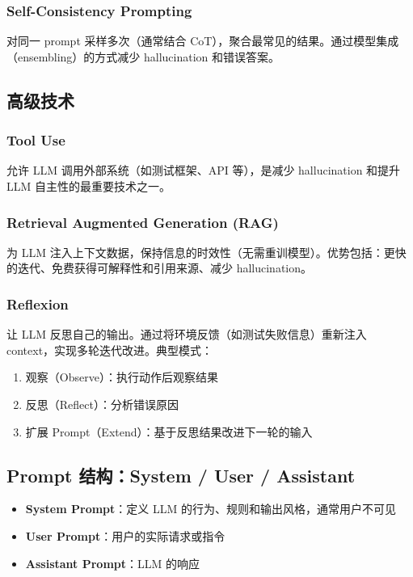 \subsubsection{Self-Consistency Prompting}

对同一 prompt 采样多次（通常结合 CoT），聚合最常见的结果。通过模型集成（ensembling）的方式减少 hallucination 和错误答案。

\subsection{高级技术}

\subsubsection{Tool Use}

允许 LLM 调用外部系统（如测试框架、API 等），是减少 hallucination 和提升 LLM 自主性的最重要技术之一。

\subsubsection{Retrieval Augmented Generation (RAG)}

为 LLM 注入上下文数据，保持信息的时效性（无需重训模型）。优势包括：更快的迭代、免费获得可解释性和引用来源、减少 hallucination。

\subsubsection{Reflexion}

让 LLM 反思自己的输出。通过将环境反馈（如测试失败信息）重新注入 context，实现多轮迭代改进。典型模式：
\begin{enumerate}
    \item 观察（Observe）：执行动作后观察结果
    \item 反思（Reflect）：分析错误原因
    \item 扩展 Prompt（Extend）：基于反思结果改进下一轮的输入
\end{enumerate}

\subsection{Prompt 结构：System / User / Assistant}

\begin{itemize}
    \item \textbf{System Prompt}：定义 LLM 的行为、规则和输出风格，通常用户不可见
    \item \textbf{User Prompt}：用户的实际请求或指令
    \item \textbf{Assistant Prompt}：LLM 的响应
\end{itemize}

